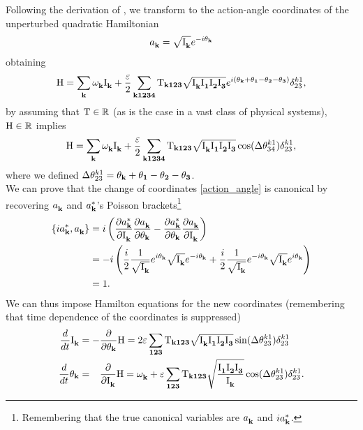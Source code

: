 Following the derivation of \cite{Onorato2020}, we transform to the action-angle coordinates of the unperturbed quadratic Hamiltonian
\begin{equation}
    a_\mathbf{k}^{} = \sqrt{\mathrm{I}^{}_\mathbf{k}}e^{-i\theta_\mathbf{k}}
    \label{action_angle}
\end{equation} 
obtaining 
\begin{equation}
    \mathrm{H} = \sum_\mathbf{k} \omega^{}_{\mathbf{k}} \mathrm{I}^{}_\mathbf{k} + \frac{\varepsilon}{2} 
    \sum_{\mathbf{k1234}}\mathrm{T}_{\mathbf{k123}}\sqrt{\mathrm{I}^{}_\mathbf{k}\mathrm{I}^{}_\mathbf{1}\mathrm{I}^{}_\mathbf{2}\mathrm{I}^{}_\mathbf{3}}
    e^{i(\theta_\mathbf{k} + \theta_\mathbf{1} - \theta_\mathbf{2} - \theta_\mathbf{3})}\delta^{k1}_{23},
\end{equation}
by assuming that $\mathrm{T} \in \mathbb{R}$ (as is the case in a vast class of physical systems), $\mathrm{H} \in \mathbb{R}$ implies 
\begin{equation}
    \mathrm{H} = \sum_\mathbf{k} \omega^{}_{\mathbf{k}} \mathrm{I}^{}_\mathbf{k} + \frac{\varepsilon}{2} \sum_{\mathbf{k1234}}\mathrm{T}_{\mathbf{k123}}\sqrt{\mathrm{I}^{}_\mathbf{k}\mathrm{I}^{}_\mathbf{1}\mathrm{I}^{}_\mathbf{2}\mathrm{I}^{}_\mathbf{3}}\cos(\Delta\theta^{k1}_{34})\delta^{k1}_{23},
\end{equation}
where we defined $\Delta\theta^{k1}_{23}=\theta_\mathbf{k} + \theta_\mathbf{1} - \theta_\mathbf{2} - \theta_\mathbf{3}$. \\
We can prove that the change of coordinates \eqref{action_angle} is canonical by recovering $a_\mathbf{k}^{}$ and $a_\mathbf{k}^{*}$'s Poisson 
brackets\footnote{Remembering that the true canonical variables are $a_\mathbf{k}^{}$ and $ia_\mathbf{k}^{*}$.}
\begin{align}
    \left\{ ia_\mathbf{k}^{*}, a_\mathbf{k}^{} \right\} &= i \left( \frac{\partial a_\mathbf{k}^{*}}{\partial \mathrm{I}^{}_\mathbf{k}}\frac{\partial a_\mathbf{k}^{}}{\partial \theta_\mathbf{k}}  -
    \frac{\partial a_\mathbf{k}^{*}}{\partial \theta_\mathbf{k}}\frac{\partial a_\mathbf{k}^{}}{\partial \mathrm{I}^{}_\mathbf{k}}  \right) \\
    &= - i \left( \frac{i}{2} \frac{1}{\sqrt{\mathrm{I}^{}_\mathbf{k}}}e^{i\theta_\mathbf{k}}\sqrt{\mathrm{I}^{}_\mathbf{k}}e^{-i\theta_\mathbf{k}} + 
    \frac{i}{2} \frac{1}{\sqrt{\mathrm{I}^{}_\mathbf{k}}}e^{-i\theta_\mathbf{k}}\sqrt{\mathrm{I}^{}_\mathbf{k}}e^{i\theta_\mathbf{k}}\right) \\
    &= 1 .
\end{align} 
We can thus impose Hamilton equations for the new coordinates (remembering that time dependence of the coordinates is suppressed)
\begin{align}
    \frac{d}{dt}\mathrm{I}^{}_\mathbf{k} &= - \frac{\partial }{\partial \theta_\mathbf{k}}\mathrm{H} = 2 \varepsilon \sum_{\mathbf{123}} \mathrm{T}_{\mathbf{k123}} \sqrt{\mathrm{I}^{}_\mathbf{k}\mathrm{I}^{}_\mathbf{1}\mathrm{I}^{}_\mathbf{2}\mathrm{I}^{}_\mathbf{3}} \sin(\Delta\theta^{k1}_{23})\delta^{k1}_{23}
    \label{Hameq1}\\
    \frac{d}{dt}\theta_\mathbf{k} &= \phantom{-} \frac{\partial }{\partial \mathrm{I}^{}_\mathbf{k}}\mathrm{H} = \omega^{}_{\mathbf{k}} + 
    \varepsilon \sum_{\mathbf{123}} \mathrm{T}_{\mathbf{k123}} \sqrt{\frac{\mathrm{I}^{}_\mathbf{1}\mathrm{I}^{}_\mathbf{2}\mathrm{I}^{}_\mathbf{3}}{\mathrm{I}^{}_\mathbf{k}}}\cos(\Delta\theta^{k1}_{23})\delta^{k1}_{23}.
    \label{Hameq2}
\end{align}
